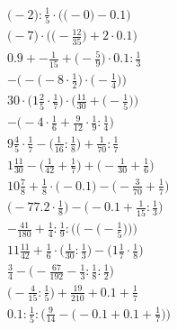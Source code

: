 \documentclass[8pt]{article}
\begin{document}
\begin{align}
\Big(-2\Big) : \frac{1}{5} \cdot \Big(\big(-0\big) - 0.1\Big) \\
\Big(-7\Big) \cdot \Big(\big(-\frac{12}{35}\big) + 2 \cdot 0.1\Big) \\
0.9 + -\frac{1}{15} + \big(-\frac{5}{9}\big) \cdot 0.1 : \frac{1}{3} \\
-\Big(-\big(-8 \cdot \frac{1}{2}\big) \cdot \big(-\frac{1}{4}\big)\Big) \\
30 \cdot \Big(1\frac{2}{5} \cdot \frac{1}{7}\Big) \cdot \Big(\frac{11}{30} + \big(-\frac{1}{5}\big)\Big) \\
-\big(-4 \cdot \frac{1}{6} + \frac{9}{12} \cdot \frac{1}{9} : \frac{1}{4}\big) \\
9\frac{4}{5} \cdot \frac{1}{7} - \big(\frac{1}{16} : \frac{1}{8}\big) + \frac{1}{70} : \frac{1}{7} \\
1\frac{11}{30} - \big(\frac{1}{42} + \frac{1}{7}\big) + \big(-\frac{1}{30} + \frac{1}{6}\big) \\
10\frac{7}{8} + \frac{1}{8} \cdot \big(-0.1\big) - \big(-\frac{3}{70} + \frac{1}{7}\big) \\
\big(-77.2 \cdot \frac{1}{8}\big) - \big(-0.1 + \frac{1}{15} : \frac{1}{3}\big) \\
-\frac{41}{180} + \frac{1}{4} : \frac{1}{9} : \bigg(\Big(-\big(-\frac{1}{5}\big)\Big)\bigg) \\
11\frac{11}{42} + \frac{1}{6} \cdot \big(\frac{1}{30} : \frac{1}{3}\big) - \big(1\frac{1}{7} \cdot \frac{1}{8}\big) \\
\frac{3}{4} - \big(-\frac{67}{192} - \frac{1}{3} : \frac{1}{8} : \frac{1}{2}\big) \\
\big(-\frac{4}{15} : \frac{1}{5}\big) + \frac{19}{210} + 0.1 + \frac{1}{7} \\
0.1 : \frac{1}{5} : \Big(\frac{9}{14} - \big(-0.1 + 0.1 + \frac{1}{7}\big)\Big)
\end{align}
\end{document}
